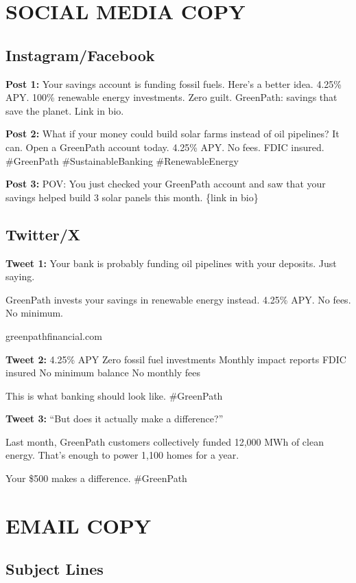 \documentclass[
    language=english,
    doctype=advertising-copy,
    institution=none,
]{../../omnilatex}
\begin{document}
\section*{SOCIAL MEDIA COPY}

\subsection*{Instagram/Facebook}

\textbf{Post 1:}
Your savings account is funding fossil fuels. Here's a better idea. 4.25\% APY. 100\% renewable energy investments. Zero guilt. GreenPath: savings that save the planet. Link in bio.

\textbf{Post 2:}
What if your money could build solar farms instead of oil pipelines? It can. Open a GreenPath account today. 4.25\% APY. No fees. FDIC insured. \#GreenPath \#SustainableBanking \#RenewableEnergy

\textbf{Post 3:}
POV: You just checked your GreenPath account and saw that your savings helped build 3 solar panels this month. \{link in bio\}

\subsection*{Twitter/X}

\textbf{Tweet 1:}
Your bank is probably funding oil pipelines with your deposits. Just saying.

GreenPath invests your savings in renewable energy instead. 4.25\% APY. No fees. No minimum.

greenpathfinancial.com

\textbf{Tweet 2:}
4.25\% APY
Zero fossil fuel investments
Monthly impact reports
FDIC insured
No minimum balance
No monthly fees

This is what banking should look like. \#GreenPath

\textbf{Tweet 3:}
``But does it actually make a difference?''

Last month, GreenPath customers collectively funded 12,000 MWh of clean energy. That's enough to power 1,100 homes for a year.

Your \$500 makes a difference. \#GreenPath

\section*{EMAIL COPY}

\subsection*{Subject Lines}
\end{document}
